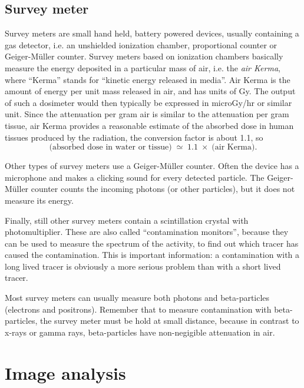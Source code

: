 \documentclass[11pt,oneside]{article}
\begin{document}
\subsection{Survey meter}
Survey meters are small hand held, battery powered devices, usually
containing a gas detector, i.e. an unshielded ionization chamber,
proportional counter or Geiger-M\"uller counter. Survey meters based
on ionization chambers basically measure the energy deposited in a
particular mass of air, i.e. the {\em air Kerma}, where ``Kerma''
stands for ``kinetic energy released in media''. Air Kerma is the
amount of energy per unit mass released in air, and has units of
Gy. The output of such a dosimeter would then typically be expressed
in microGy/hr or similar unit. Since the attenuation per gram air is
similar to the attenuation per gram tissue, air Kerma provides a
reasonable estimate of the absorbed dose in human tissues produced by
the radiation, the conversion factor is about 1.1, so
\begin{equation}
  \mbox{(absorbed dose in water or tissue)} \; \simeq \; 1.1 \; \times \;
    \mbox{(air Kerma)}.
\end{equation}

Other types of survey meters use a Geiger-M\"uller counter.
Often the device has a microphone and makes a
clicking sound for every detected particle. The Geiger-M\"uller
counter counts the incoming photons (or other particles), but it does
not measure its energy.

Finally, still other survey meters contain a scintillation crystal
with photomultiplier. These are also called ``contamination
monitors'', because they can be used to measure the spectrum of the
activity, to find out which tracer has caused the contamination.  This
is important information: a contamination with a long lived tracer is
obviously a more serious problem than with a short lived tracer.

Most survey meters can usually measure both photons and beta-particles
(electrons and positrons). Remember that to measure contamination with
beta-particles, the survey meter must be hold at small distance, because
in contrast to x-rays or gamma rays,
beta-particles have non-negigible attenuation in air.

\section{Image analysis}

\end{document}
